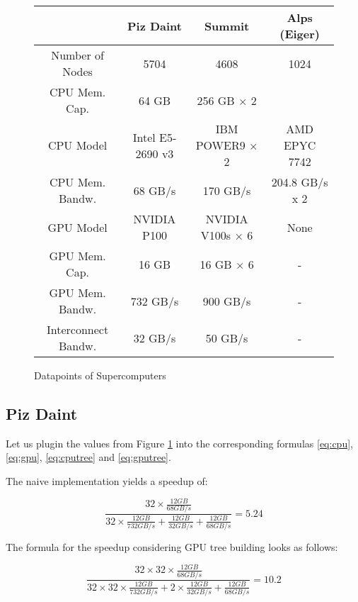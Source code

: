 \documentclass[]{article}
\begin{document}
\small
\begin{figure}[H]
	\begin{center}
		\begin{tabular}{ c c c c }
			& Piz Daint \cite{piz_daint} & Summit & Alps (Eiger) \\ 
			\hline
			Number of Nodes & 5704 & 4608 & 1024\\
			CPU Mem. Cap. & 64 GB & 256 GB $\times$ 2  \\   
			CPU Model & Intel E5-2690 v3 & IBM POWER9 $\times$ 2 & AMD EPYC 7742 \\
			CPU Mem. Bandw.  & 68 GB/s & 170 GB/s & 204.8 GB/s x 2	\\
			GPU Model & NVIDIA P100 & NVIDIA V100s  $\times$ 6 & None \\
			GPU Mem. Cap. & 16 GB & 16 GB $\times$ 6 & -\\
			GPU Mem. Bandw. & 732 GB/s & 900 GB/s & -\\
			Interconnect Bandw. & 32 GB/s & 50 GB/s & -\\
		\end{tabular}
	\end{center}
\caption{Datapoints of Supercomputers}
\label{fig:datapoints}
\end{figure}

\normalfont
\subsection{Piz Daint} 

Let us plugin the values from Figure \ref{fig:datapoints} into the corresponding formulas \ref{eq:cpu}, \ref{eq:gpu}, \ref{eq:cputree} and \ref{eq:gputree}.

The naive implementation yields a speedup of:

\begin{center}
	\begin{equation}
		\frac{32 \times \frac{ 12 GB }{68 GB/s}}
		{32 \times \frac{12 GB}{732 GB/s} + \frac{12 GB}{32 GB/s}  + \frac{12 GB}{68 GB/s}}
		= 5.24
	\end{equation}
\end{center}

The formula for the speedup considering GPU tree building looks as follows:
\begin{center}
	\begin{equation}
		\frac{32 \times 32 \times \frac{ 12 GB }{68 GB/s}}
		{32 \times 32 \times \frac{12 GB}{732 GB/s} + 2 \times \frac{12 GB}{32 GB/s}  + \frac{12 GB}{68 GB/s}}
		= 10.2
	\end{equation}
\end{center}
\end{document}
